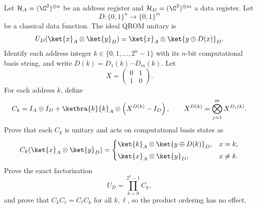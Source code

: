 Let $\mathcal H_A=(\C^2)^{\otimes n}$ be an address register and $\mathcal H_D=(\C^2)^{\otimes m}$ a data register.  Let
$$
    D:\{0,1\}^n\to\{0,1\}^m
$$
be a classical data function.  The ideal QROM unitary is
$$
    U_D(\ket{x}_A\otimes\ket{y}_D)
    =
    \ket{x}_A\otimes\ket{y\oplus D(x)}_D.
$$
Identify each address integer $k\in\{0,1,\dots,2^n-1\}$ with its $n$-bit computational basis string, and write $D(k)=D_1(k)\cdots D_m(k)$.  Let
$$
    X=\begin{pmatrix}0&1\\1&0\end{pmatrix}.
$$
For each address $k$, define
$$
    C_k
    =
    I_A\otimes I_D
    +
    \ketbra{k}{k}_A
    \otimes
    \left(X^{D(k)}-I_D\right),
    \qquad
    X^{D(k)}=\bigotimes_{j=1}^m X^{D_j(k)}.
$$
Prove that each $C_k$ is unitary and acts on computational basis states as
$$
    C_k(\ket{x}_A\otimes\ket{y}_D)
    =
    \begin{cases}
    \ket{k}_A\otimes\ket{y\oplus D(k)}_D, & x=k,\\[1mm]
    \ket{x}_A\otimes\ket{y}_D, & x\neq k.
    \end{cases}
$$
Prove the exact factorization
$$
    U_D=\prod_{k=0}^{2^n-1}C_k,
$$
and prove that $C_kC_\ell=C_\ell C_k$ for all $k,\ell$, so the product ordering has no effect.
